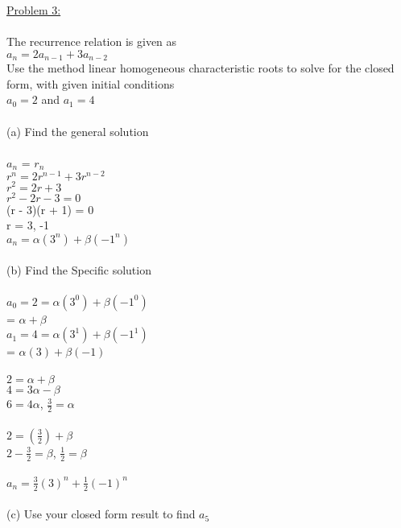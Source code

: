 \documentclass{article}
\begin{document}
    \underline{Problem 3:}\\\\
    The recurrence relation is given as \\
    \indent $a_n = 2a_{n-1} + 3a_{n-2}$\\
    Use the method linear homogeneous characteristic roots to solve for the closed form, with given initial conditions\\
    \indent $a_0 = 2$ and $a_1 = 4$\\
    \\
    (a) Find the general solution\\
    \\
    \indent $a_n$ = $r_n$\\
    \indent $r^n = 2r^{n-1} + 3r^{n-2}$\\
    \indent $r^2 = 2r + 3$\\
    \indent $r^2 - 2r - 3 = 0$\\
    \indent (r - 3)(r + 1) = 0\\
    \indent r = 3, -1\\
    \indent $a_n = \alpha(3^n) + \beta(-1^n)$\\
    \\
    (b) Find the Specific solution\\
    \\
    \indent $a_0 = 2 = \alpha(3^0) + \beta(-1^0)$\\
    \indent\hspace{9.5pt} = $\alpha + \beta$\\
    \indent $a_1 = 4 = \alpha(3^1) + \beta(-1^1)$\\
    \indent\hspace{9.5pt} = $\alpha(3) + \beta(-1)$\\
    \\
    \indent $2 = \alpha + \beta$\\
    \indent $4 = 3\alpha - \beta$\\
    \indent $6 = 4\alpha$, $\frac{3}{2} = \alpha$\\
    \\
    \indent $2 = (\frac{3}{2}) + \beta$\\
    \indent $2 - \frac{3}{2} = \beta$, $\frac{1}{2} = \beta$\\
    \\
    \indent $a_n = \frac{3}{2}(3)^n + \frac{1}{2}(-1)^n$\\
    \\
    (c) Use your closed form result to find $a_5$\\
\end{document}
